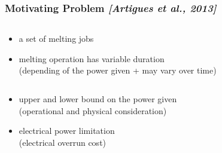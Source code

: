 \begin{frame}
  \frametitle{Motivating Problem 
 {\small \it \color{gray!50!black!50} [Artigues et al., 2013]}}
  \vfill
  \begin{columns}
    \begin{column}{0.5\linewidth}
      \begin{itemize}
      \item a set of melting jobs
\pause
        \vspace{0.4cm}
      \item melting operation has variable duration\\
        {\small (depending of the power given + may vary over time)}
\pause
         \vspace{0.4cm}
      \end{itemize}     
    \end{column}
    \hfill 
 \begin{column}{0.4\linewidth}
    \end{column}
  \end{columns}
  \vfill
  \begin{itemize}
  \item upper and lower bound on the power given \\
    {\small(operational and physical consideration)}
    \vspace{0.4cm}
\pause
  \item electrical power limitation\\
    {\small(electrical overrun cost)}
  \end{itemize}
\end{frame}

